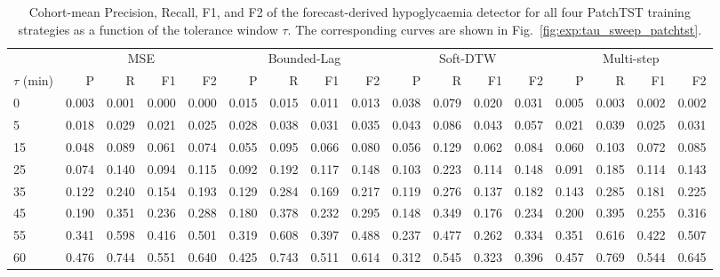 \begin{appendix}
\begin{landscape}
\begin{table}[tbp]
\centering
\small
\caption[$\tau$-sweep numerical breakdown: PatchTST]{Cohort-mean Precision, Recall, F1, and F2 of the forecast-derived hypoglycaemia detector for all four PatchTST training strategies as a function of the tolerance window $\tau$. The corresponding curves are shown in Fig.~\ref{fig:exp:tau_sweep_patchtst}.}
\label{tab:app:tau_sweep_patchtst}
\setlength{\tabcolsep}{4pt}
\begin{tabular}{lrrrrrrrrrrrrrrrr}
\toprule
& \multicolumn{4}{c}{MSE} & \multicolumn{4}{c}{Bounded-Lag} & \multicolumn{4}{c}{Soft-DTW} & \multicolumn{4}{c}{Multi-step} \\
\cmidrule(lr){2-5}\cmidrule(lr){6-9}\cmidrule(lr){10-13}\cmidrule(lr){14-17}
$\tau$ (min) & P & R & F1 & F2 & P & R & F1 & F2 & P & R & F1 & F2 & P & R & F1 & F2 \\
\midrule
 0  & 0.003 & 0.001 & 0.000 & 0.000 & 0.015 & 0.015 & 0.011 & 0.013 & 0.038 & 0.079 & 0.020 & 0.031 & 0.005 & 0.003 & 0.002 & 0.002 \\
 5  & 0.018 & 0.029 & 0.021 & 0.025 & 0.028 & 0.038 & 0.031 & 0.035 & 0.043 & 0.086 & 0.043 & 0.057 & 0.021 & 0.039 & 0.025 & 0.031 \\
15  & 0.048 & 0.089 & 0.061 & 0.074 & 0.055 & 0.095 & 0.066 & 0.080 & 0.056 & 0.129 & 0.062 & 0.084 & 0.060 & 0.103 & 0.072 & 0.085 \\
25  & 0.074 & 0.140 & 0.094 & 0.115 & 0.092 & 0.192 & 0.117 & 0.148 & 0.103 & 0.223 & 0.114 & 0.148 & 0.091 & 0.185 & 0.114 & 0.143 \\
35  & 0.122 & 0.240 & 0.154 & 0.193 & 0.129 & 0.284 & 0.169 & 0.217 & 0.119 & 0.276 & 0.137 & 0.182 & 0.143 & 0.285 & 0.181 & 0.225 \\
45  & 0.190 & 0.351 & 0.236 & 0.288 & 0.180 & 0.378 & 0.232 & 0.295 & 0.148 & 0.349 & 0.176 & 0.234 & 0.200 & 0.395 & 0.255 & 0.316 \\
55  & 0.341 & 0.598 & 0.416 & 0.501 & 0.319 & 0.608 & 0.397 & 0.488 & 0.237 & 0.477 & 0.262 & 0.334 & 0.351 & 0.616 & 0.422 & 0.507 \\
60  & 0.476 & 0.744 & 0.551 & 0.640 & 0.425 & 0.743 & 0.511 & 0.614 & 0.312 & 0.545 & 0.323 & 0.396 & 0.457 & 0.769 & 0.544 & 0.645 \\
\bottomrule
\end{tabular}
\end{table}
\end{landscape}

\end{appendix}
